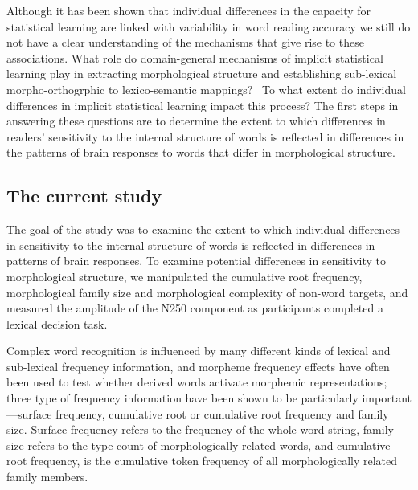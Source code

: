 \documentclass[review]{elsarticle}
\begin{document}
Although it has been shown that individual differences in the capacity for statistical learning are linked with variability in word reading accuracy \citep{arciuliReadingStatisticalLearning2018, arciuliStatisticalLearningRelated2012} we still do not have a clear understanding of the mechanisms that give rise to these associations. What role do domain-general mechanisms of implicit statistical learning play in extracting morphological structure and establishing sub-lexical morpho-orthogrphic to lexico-semantic mappings?  To what extent do individual differences in implicit statistical learning impact this process? The first steps in answering these questions are to determine the extent to which differences in readers’ sensitivity to the internal structure of words is reflected in differences in the patterns of brain responses to words that differ in morphological structure. 

\subsection{The current study}

The goal of the study was to examine the extent to which  individual differences in sensitivity to the internal structure of words is reflected in differences in  patterns of brain responses. To examine potential differences in sensitivity to morphological structure, we manipulated the cumulative root frequency, morphological family size and morphological complexity of non-word targets, and measured the amplitude of the N250 component as participants completed a lexical decision task.  

Complex word recognition is influenced by many different kinds of lexical and sub-lexical frequency  information, and morpheme frequency effects have often been used to test whether derived words activate morphemic representations; three type of frequency information have been shown to be particularly important—surface frequency, cumulative root or cumulative root frequency and family size. Surface frequency refers to the frequency of the whole-word string, family size refers to the type count of morphologically related words, and cumulative root frequency, is the cumulative token frequency of all morphologically related family members. 
\end{document}
